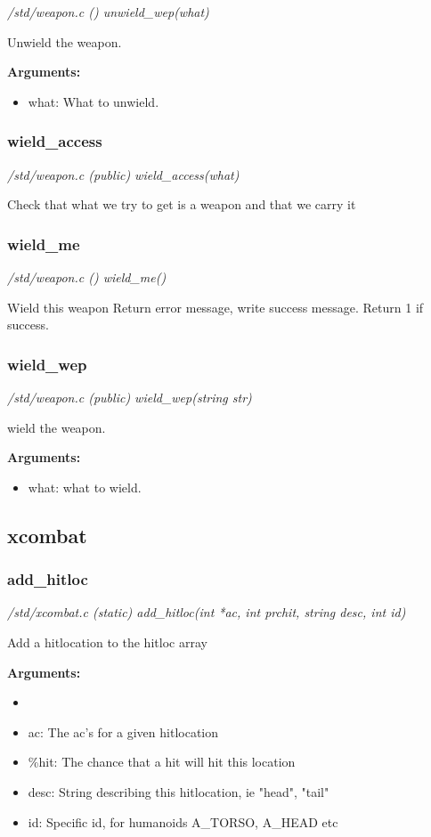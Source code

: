 {\em /std/weapon.c () unwield\_wep(what)}

Unwield the weapon.

{\bf Arguments:}
\begin{itemize}
\item     what: What to unwield.
\end{itemize}


\subsubsection{wield\_access}

{\em /std/weapon.c (public) wield\_access(what)}

Check that what we try to get is a weapon and that we carry it


\subsubsection{wield\_me}

{\em /std/weapon.c () wield\_me()}

Wield this weapon
Return error message, write success message. Return 1 if success.


\subsubsection{wield\_wep}

{\em /std/weapon.c (public) wield\_wep(string str)}

wield the weapon.

{\bf Arguments:}
\begin{itemize}
\item     what: what to wield.
\end{itemize}


\subsection{xcombat}
\subsubsection{add\_hitloc}

{\em /std/xcombat.c (static) add\_hitloc(int *ac, int prchit, string desc, int id)}

Add a hitlocation to the hitloc array

{\bf Arguments:}
\begin{itemize}
\item     
\item ac:    The ac's for a given hitlocation
\item \%hit:  The chance that a hit will hit this location
\item desc:  String describing this hitlocation, ie "head", "tail"
\item id:    Specific id, for humanoids A\_TORSO, A\_HEAD etc
\end{itemize}


